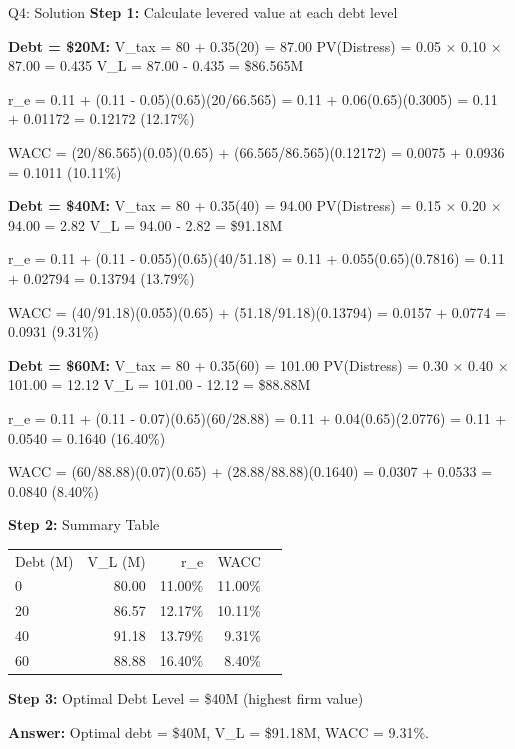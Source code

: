 \documentclass{beamer}
\renewcommand{\scriptsize}{\fontsize{6pt}{7pt}\selectfont}
\begin{document}
	\begin{frame}{Q4: Solution}
		\scriptsize
		\textbf{Step 1:} Calculate levered value at each debt level
		
		\textbf{Debt = \$20M:}
		V\_tax = 80 + 0.35(20) = 87.00
		PV(Distress) = 0.05 × 0.10 × 87.00 = 0.435
		V\_L = 87.00 - 0.435 = \$86.565M
		
		r\_e = 0.11 + (0.11 - 0.05)(0.65)(20/66.565) = 0.11 + 0.06(0.65)(0.3005) = 0.11 + 0.01172 = 0.12172 (12.17\%)
		
		WACC = (20/86.565)(0.05)(0.65) + (66.565/86.565)(0.12172) = 0.0075 + 0.0936 = 0.1011 (10.11\%)
		
		\textbf{Debt = \$40M:}
		V\_tax = 80 + 0.35(40) = 94.00
		PV(Distress) = 0.15 × 0.20 × 94.00 = 2.82
		V\_L = 94.00 - 2.82 = \$91.18M
		
		r\_e = 0.11 + (0.11 - 0.055)(0.65)(40/51.18) = 0.11 + 0.055(0.65)(0.7816) = 0.11 + 0.02794 = 0.13794 (13.79\%)
		
		WACC = (40/91.18)(0.055)(0.65) + (51.18/91.18)(0.13794) = 0.0157 + 0.0774 = 0.0931 (9.31\%)
		
		\textbf{Debt = \$60M:}
		V\_tax = 80 + 0.35(60) = 101.00
		PV(Distress) = 0.30 × 0.40 × 101.00 = 12.12
		V\_L = 101.00 - 12.12 = \$88.88M
		
		r\_e = 0.11 + (0.11 - 0.07)(0.65)(60/28.88) = 0.11 + 0.04(0.65)(2.0776) = 0.11 + 0.0540 = 0.1640 (16.40\%)
		
		WACC = (60/88.88)(0.07)(0.65) + (28.88/88.88)(0.1640) = 0.0307 + 0.0533 = 0.0840 (8.40\%)
		
		\vspace{2pt}
		\textbf{Step 2:} Summary Table
		
		\begin{tabular}{lrrrr}
			Debt (M) & V\_L (M) & r\_e & WACC \\
			0 & 80.00 & 11.00\% & 11.00\% \\
			20 & 86.57 & 12.17\% & 10.11\% \\
			40 & 91.18 & 13.79\% & 9.31\% \\
			60 & 88.88 & 16.40\% & 8.40\% \\
		\end{tabular}
		
		\vspace{2pt}
		\textbf{Step 3:} Optimal Debt Level = \$40M (highest firm value)
		
		\textbf{Answer:} Optimal debt = \$40M, V\_L = \$91.18M, WACC = 9.31\%.
	\end{frame}
	
\end{document}
